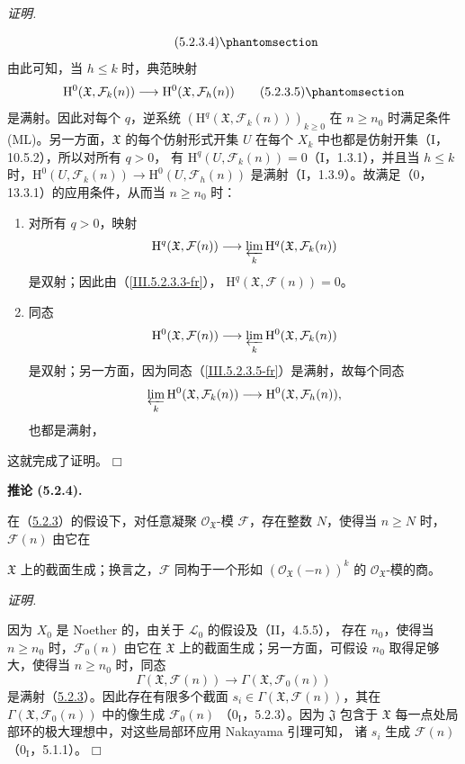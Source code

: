 \documentclass[UTF8,fontset=none,11pt,oneside,openany]{ctexbook}
\providecommand{\square}{\mdlgwhtsquare}
\newenvironment{corollary}[1][]{%
  \par\medskip\noindent\textbf{推论 (#1).}\ %
}{\par}
\newenvironment{proof}{%
  \par\smallskip\noindent\textit{证明.}\ %
}{\hfill$\square$\par}
\newcommand{\oldpage}[2][]{%
  \hypertarget{ega-source-page-#1-#2}{}%
  \marginnote{\scriptsize\textbf{#1}~|~#2}\ignorespaces}
\let\EGAOriginalLabel\label
\renewcommand{\label}[1]{\phantomsection\EGAOriginalLabel{#1}}
\begin{document}
\begin{proof}
\begin{equation}
\tag{5.2.3.4}
\label{III.5.2.3.4-fr}
\end{equation}
由此可知，当 $h\leq k$ 时，典范映射
\begin{equation}
\mathrm H^0(\mathfrak X,\mathcal F_k(n))\longrightarrow
\mathrm H^0(\mathfrak X,\mathcal F_h(n))
\tag{5.2.3.5}
\label{III.5.2.3.5-fr}
\end{equation}
是满射。因此对每个 $q$，逆系统
$(\mathrm H^q(\mathfrak X,\mathcal F_k(n)))_{k\geq0}$ 在
$n\geq n_0$ 时满足条件 (ML)。另一方面，$\mathfrak X$ 的每个仿射形式开集
$U$ 在每个 $X_k$ 中也都是仿射开集（I，10.5.2），所以对所有 $q>0$，
有 $\mathrm H^q(U,\mathcal F_k(n))=0$（I，1.3.1），并且当 $h\leq k$
时，$\mathrm H^0(U,\mathcal F_k(n))\to\mathrm H^0(U,\mathcal F_h(n))$
是满射（I，1.3.9）。故满足（$0$，13.3.1）的应用条件，从而当
$n\geq n_0$ 时：
\begin{enumerate}
\item[$1^\circ$] 对所有 $q>0$，映射
\[
\mathrm H^q(\mathfrak X,\mathcal F(n))\longrightarrow
\varprojlim_k\mathrm H^q(\mathfrak X,\mathcal F_k(n))
\]
是双射；因此由（\ref{III.5.2.3.3-fr}），
$\mathrm H^q(\mathfrak X,\mathcal F(n))=0$。
\item[$2^\circ$] 同态
\[
\mathrm H^0(\mathfrak X,\mathcal F(n))\longrightarrow
\varprojlim_k\mathrm H^0(\mathfrak X,\mathcal F_k(n))
\]
是双射；另一方面，因为同态（\ref{III.5.2.3.5-fr}）是满射，故每个同态
\[
\varprojlim_k\mathrm H^0(\mathfrak X,\mathcal F_k(n))
\longrightarrow\mathrm H^0(\mathfrak X,\mathcal F_h(n)),
\]
也都是满射，
\end{enumerate}
这就完成了证明。
\end{proof}

\begin{corollary}[5.2.4]
\label{III.5.2.4-fr}
在（\hyperref[III.5.2.3-fr]{5.2.3}）的假设下，对任意凝聚
$\mathcal O_{\mathfrak X}$-模 $\mathcal F$，存在整数 $N$，使得当
$n\geq N$ 时，$\mathcal F(n)$ 由它在

\oldpage[III]{153}

$\mathfrak X$ 上的截面生成；换言之，$\mathcal F$ 同构于一个形如
$(\mathcal O_{\mathfrak X}(-n))^k$ 的 $\mathcal O_{\mathfrak X}$-模的商。
\end{corollary}

\begin{proof}
因为 $X_0$ 是 Noether 的，由关于 $\mathcal L_0$ 的假设及（II，4.5.5），
存在 $n_0$，使得当 $n\geq n_0$ 时，$\mathcal F_0(n)$ 由它在
$\mathfrak X$ 上的截面生成；另一方面，可假设 $n_0$ 取得足够大，使得当
$n\geq n_0$ 时，同态
\[
\Gamma(\mathfrak X,\mathcal F(n))\longrightarrow
\Gamma(\mathfrak X,\mathcal F_0(n))
\]
是满射（\hyperref[III.5.2.3-fr]{5.2.3}）。因此存在有限多个截面
$s_i\in\Gamma(\mathfrak X,\mathcal F(n))$，其在
$\Gamma(\mathfrak X,\mathcal F_0(n))$ 中的像生成 $\mathcal F_0(n)$
（$0_{\mathrm I}$，5.2.3）。因为 $\mathfrak J$ 包含于 $\mathfrak X$
每一点处局部环的极大理想中，对这些局部环应用 Nakayama 引理可知，
诸 $s_i$ 生成 $\mathcal F(n)$（$0_{\mathrm I}$，5.1.1）。
\end{proof}
\end{document}
